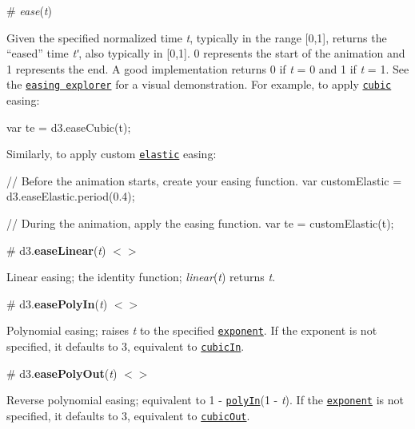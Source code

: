 \label{__ease}%
\# {\itshape ease}({\itshape t})

Given the specified normalized time {\itshape t}, typically in the range \mbox{[}0,1\mbox{]}, returns the “eased” time {\itshape tʹ}, also typically in \mbox{[}0,1\mbox{]}. 0 represents the start of the animation and 1 represents the end. A good implementation returns 0 if {\itshape t} = 0 and 1 if {\itshape t} = 1. See the \href{http://bl.ocks.org/mbostock/248bac3b8e354a9103c4}{\tt easing explorer} for a visual demonstration. For example, to apply \href{#easeCubic}{\tt cubic} easing\+:


\begin{DoxyCode}
var te = d3.easeCubic(t);
\end{DoxyCode}


Similarly, to apply custom \href{#easeElastic}{\tt elastic} easing\+:


\begin{DoxyCode}
// Before the animation starts, create your easing function.
var customElastic = d3.easeElastic.period(0.4);

// During the animation, apply the easing function.
var te = customElastic(t);
\end{DoxyCode}


\label{_easeLinear}%
\# d3.{\bfseries ease\+Linear}({\itshape t}) \href{https://github.com/d3/d3-ease/blob/master/src/linear.js}{\tt $<$$>$}

Linear easing; the identity function; {\itshape linear}({\itshape t}) returns {\itshape t}.

\href{http://bl.ocks.org/mbostock/248bac3b8e354a9103c4/#linear}{\tt }

\label{_easePolyIn}%
\# d3.{\bfseries ease\+Poly\+In}({\itshape t}) \href{https://github.com/d3/d3-ease/blob/master/src/poly.js#L3}{\tt $<$$>$}

Polynomial easing; raises {\itshape t} to the specified \href{#poly_exponent}{\tt exponent}. If the exponent is not specified, it defaults to 3, equivalent to \href{#easeCubicIn}{\tt cubic\+In}.

\href{http://bl.ocks.org/mbostock/248bac3b8e354a9103c4/#polyIn}{\tt }

\label{_easePolyOut}%
\# d3.{\bfseries ease\+Poly\+Out}({\itshape t}) \href{https://github.com/d3/d3-ease/blob/master/src/poly.js#L15}{\tt $<$$>$}

Reverse polynomial easing; equivalent to 1 -\/ \href{#easePolyIn}{\tt poly\+In}(1 -\/ {\itshape t}). If the \href{#poly_exponent}{\tt exponent} is not specified, it defaults to 3, equivalent to \href{#easeCubicOut}{\tt cubic\+Out}.


